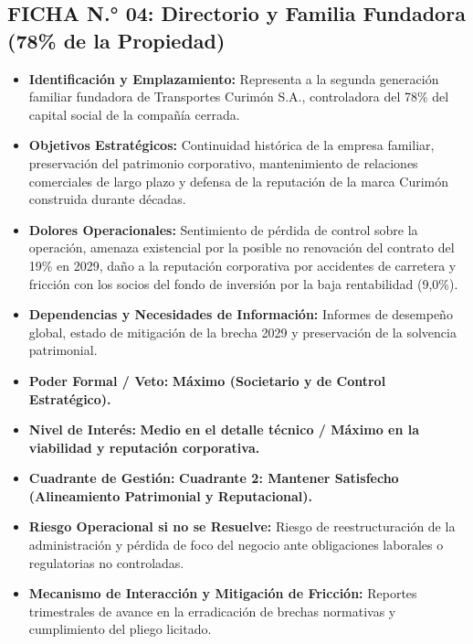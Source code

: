 \subsection*{FICHA N.° 04: Directorio y Familia Fundadora (78\% de la Propiedad)}
\begin{itemize}
\item \textbf{Identificación y Emplazamiento:} Representa a la segunda generación familiar fundadora de Transportes Curimón S.A., controladora del 78\% del capital social de la compañía cerrada.
\item \textbf{Objetivos Estratégicos:} Continuidad histórica de la empresa familiar, preservación del patrimonio corporativo, mantenimiento de relaciones comerciales de largo plazo y defensa de la reputación de la marca Curimón construida durante décadas.
\item \textbf{Dolores Operacionales:} Sentimiento de pérdida de control sobre la operación, amenaza existencial por la posible no renovación del contrato del 19\% en 2029, daño a la reputación corporativa por accidentes de carretera y fricción con los socios del fondo de inversión por la baja rentabilidad (9,0\%).
\item \textbf{Dependencias y Necesidades de Información:} Informes de desempeño global, estado de mitigación de la brecha 2029 y preservación de la solvencia patrimonial.
\item \textbf{Poder Formal / Veto:} \textbf{Máximo (Societario y de Control Estratégico).}
\item \textbf{Nivel de Interés:} \textbf{Medio en el detalle técnico / Máximo en la viabilidad y reputación corporativa.}
\item \textbf{Cuadrante de Gestión:} \textbf{Cuadrante 2: Mantener Satisfecho (Alineamiento Patrimonial y Reputacional).}
\item \textbf{Riesgo Operacional si no se Resuelve:} Riesgo de reestructuración de la administración y pérdida de foco del negocio ante obligaciones laborales o regulatorias no controladas.
\item \textbf{Mecanismo de Interacción y Mitigación de Fricción:} Reportes trimestrales de avance en la erradicación de brechas normativas y cumplimiento del pliego licitado.
\end{itemize}
